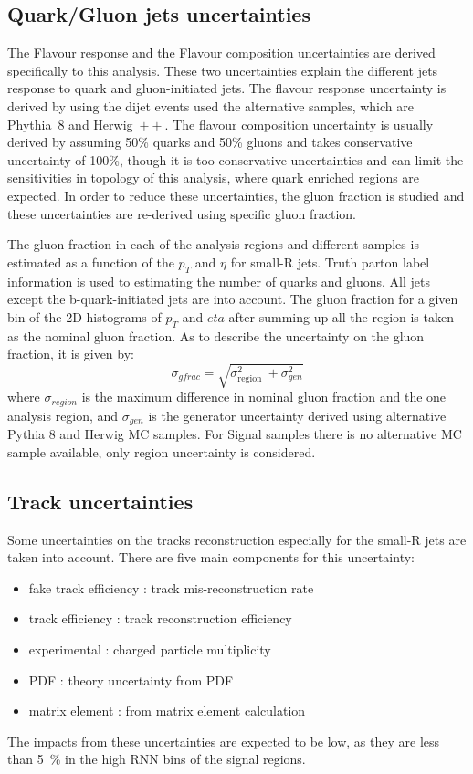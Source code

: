 \subsection{Quark/Gluon jets uncertainties}
The Flavour response and the Flavour composition uncertainties are derived specifically to this analysis.
These two uncertainties explain the different jets response to quark and gluon-initiated jets. The flavour response uncertainty is derived by using the dijet events used the alternative samples, which are Phythia~8 and Herwig~$\plus\plus$. The flavour composition uncertainty is usually derived by assuming 50\% quarks and 50\% gluons and takes conservative uncertainty of 100\%, though it is too conservative uncertainties and can limit the sensitivities in topology of this analysis, where quark enriched regions are expected. In order to reduce these uncertainties, the gluon fraction is studied and these uncertainties are re-derived using specific gluon fraction.

The gluon fraction in each of the analysis regions and different samples is estimated as a function of the $p_T$ and $\eta$ for small-R jets. Truth parton label information is used to estimating the number of quarks and gluons. All jets except the b-quark-initiated jets are into account.
The gluon fraction for a given bin of the 2D histograms of $p_T$ and $eta$ after summing up all the region is taken as the nominal gluon fraction. As to describe the uncertainty on the gluon fraction, it is given by:
\begin{equation}
\sigma_{gfrac}=\sqrt{\sigma_{\text {region }}^{2}+\sigma_{g e n}^{2}}
\end{equation}
where $\sigma_{region}$ is the maximum difference in nominal gluon fraction and the one analysis region, and $\sigma_{gen}$ is the generator uncertainty derived using alternative Pythia 8 and Herwig MC samples. For Signal samples there is no alternative MC sample available, only region uncertainty is considered.
\subsection{Track uncertainties}
Some uncertainties on the tracks reconstruction especially for the small-R jets are taken into account. There are five main components for this uncertainty: 
\begin{itemize}
    \item fake track efficiency : track mis-reconstruction rate  
    \item track efficiency : track reconstruction efficiency
    \item experimental : charged particle multiplicity 
    \item PDF : theory uncertainty from PDF
    \item matrix element : from matrix element calculation
\end{itemize}
The impacts from these uncertainties are expected to be low, as they are less than 5~\% in the high RNN bins of the signal regions.

